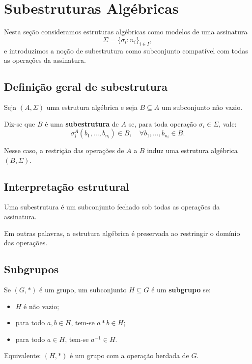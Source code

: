 \documentclass[../../main]{subfiles}
\begin{document}
\section{Subestruturas Algébricas}
\label{sec:matematica:algebra:estruturas-algebricas:subestruturas}

Nesta seção consideramos estruturas algébricas como modelos de uma assinatura
\[
	\Sigma = \{\sigma_i : n_i\}_{i \in I},
\]
e introduzimos a noção de subestrutura como subconjunto compatível com todas as operações da assinatura.

\subsection{Definição geral de subestrutura}

Seja $(A, \Sigma)$ uma estrutura algébrica e seja $B \subseteq A$ um subconjunto não vazio.

Diz-se que $B$ é uma \textbf{subestrutura} de $A$ se, para toda operação $\sigma_i \in \Sigma$, vale:
\[
	\sigma_i^A(b_1,\dots,b_{n_i}) \in B,
	\quad \forall b_1,\dots,b_{n_i} \in B.
\]

Nesse caso, a restrição das operações de $A$ a $B$ induz uma estrutura algébrica $(B, \Sigma)$.

\subsection{Interpretação estrutural}

Uma subestrutura é um subconjunto fechado sob todas as operações da assinatura.

Em outras palavras, a estrutura algébrica é preservada ao restringir o domínio das operações.

\subsection{Subgrupos}

Se $(G,\ast)$ é um grupo, um subconjunto $H \subseteq G$ é um \textbf{subgrupo} se:

\begin{itemize}
	\item $H$ é não vazio;
	\item para todo $a,b \in H$, tem-se $a \ast b \in H$;
	\item para todo $a \in H$, tem-se $a^{-1} \in H$.
\end{itemize}

Equivalente: $(H,\ast)$ é um grupo com a operação herdada de $G$.
\end{document}

